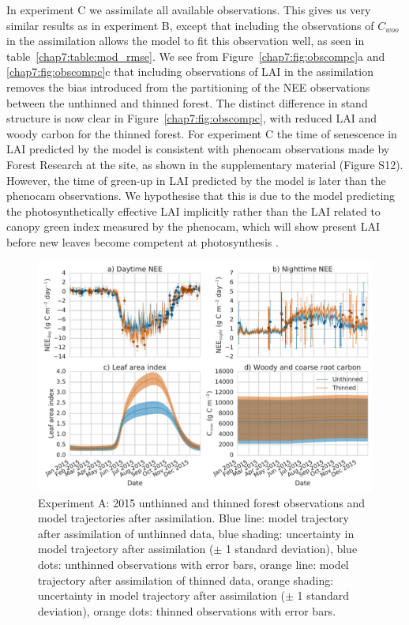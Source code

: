 In experiment C we assimilate all available observations. This gives us very similar results as in experiment B, except that including the observations of \(C_{woo}\) in the assimilation allows the model to fit this observation well, as seen in table~\ref{chap7:table:mod_rmse}. We see from Figure~\ref{chap7:fig:obscompc}a and \ref{chap7:fig:obscompc}c that including observations of LAI in the assimilation removes the bias introduced from the partitioning of the NEE observations between the unthinned and thinned forest. The distinct difference in stand structure is now clear in Figure~\ref{chap7:fig:obscompc}, with reduced LAI and woody carbon for the thinned forest. For experiment C the time of senescence in LAI predicted by the model is consistent with phenocam observations made by Forest Research at the site, as shown in the supplementary material (Figure S12). However, the time of green-up in LAI predicted by the model is later than the phenocam observations. We hypothesise that this is due to the model predicting the photosynthetically effective LAI implicitly rather than the LAI related to canopy green index measured by the phenocam, which will show present LAI before new leaves become competent at photosynthesis \citep{reich1991leaf, Morecroft2003}.   

\begin{figure}[ht]
    \centering
        \includegraphics[width=\textwidth]{chapter/chapter7/obs_compa.pdf}
\caption{Experiment A: 2015 unthinned and thinned forest observations and model trajectories after assimilation. Blue line: model trajectory after assimilation of unthinned data, blue shading: uncertainty in model trajectory after assimilation (\(\pm\) 1 standard deviation), blue dots: unthinned observations with error bars, orange line: model trajectory after assimilation of thinned data, orange shading: uncertainty in model trajectory after assimilation (\(\pm\) 1 standard deviation), orange dots: thinned observations with error bars.}
 \label{chap7:fig:obscompa}
 \end{figure}
 
